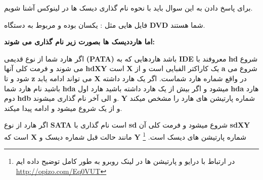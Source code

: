    برای پاسخ دادن به این سوال باید با نحوه نام گذاری دیسک ها در لینوکس آشنا شویم.

فایل هایی مثل :
\textbf{}
  یکسان بوده و مربوط به دستگاه 
  \textbf{DVD}
   شما هستند.

\textbf{اما هارددیسک ها بصورت زیر نام گذاری می شوند:}

اگر هارد شما از نوع قدیمی 
\textbf{(PATA)}
باشد هاردهایی که به 
\textbf{IDE}
 معروفند با 
 \textbf{hd}
  شروع می شوند و فرمت کلی آنها 
  \textbf{hdXY}
   است
   \textbf{ X }
   یک کاراکتر الفبایی است و از 
   \textbf{a}
    شروع می شود و تا 
    \textbf{z }
    می تواند ادامه یابد 
    \textbf{X}
     در واقع شماره هارد شماست. اگر یک هارد داشته باشید نام هارد شما 
     \textbf{hda}
      میشود و اگر بیش از یک هارد داشته باشید هارد اول 
      \textbf{hda}
       هارد دوم 
       \textbf{hdb}
        و الی آخر نام گذاری میشوند. 
        \textbf{Y}
         شماره پارتیشن های هارد را مشخص میکند و از یک شروع میشود و ادامه پیدا میکند.

اگر هارد از نوع 
\textbf{SATA}
 است نام گذاری با 
 \textbf{sd }
 شروع میشود و فرمت کلی آن 
 \textbf{sdXY}
  است که 
   \textbf{X}
   مانند حالت قبل شماره دیسک و 
   \textbf{Y}
    شماره پارتیشن های دیسک است.
\footnote{در ارتباط با درایو و پارتیشن ها در لینک روبرو به طور کامل توضیح داده ایم
\href{http://www.linuxfedora.ir/topic-t12.html\#p13}{http://opizo.com/Eq0VUT}
}
